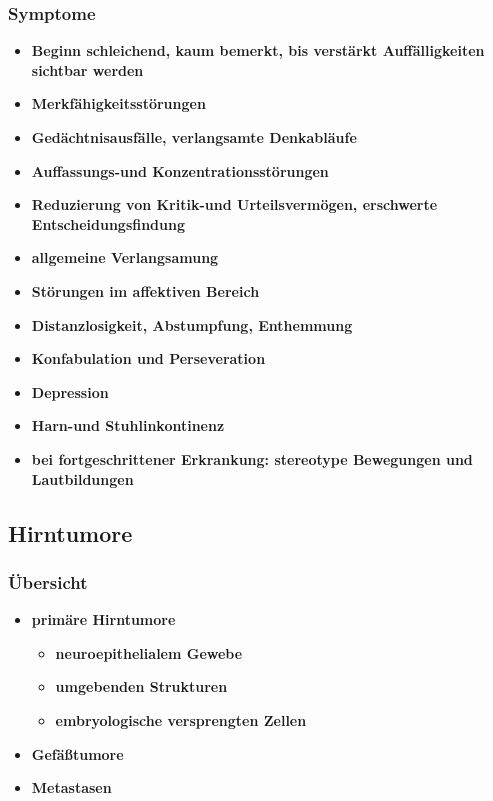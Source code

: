 		\subsubsection{Symptome}
			\begin{itemize}
				\item \textbf{Beginn schleichend, kaum bemerkt, bis verstärkt Auffälligkeiten sichtbar werden}
				\item \textbf{Merkfähigkeitsstörungen}
				\item \textbf{Gedächtnisausfälle, verlangsamte Denkabläufe}
				\item \textbf{Auffassungs-und Konzentrationsstörungen}
				\item \textbf{Reduzierung von Kritik-und Urteilsvermögen, erschwerte Entscheidungsfindung}
				\item \textbf{allgemeine Verlangsamung}
				\item \textbf{Störungen im affektiven Bereich}
				\item \textbf{Distanzlosigkeit, Abstumpfung, Enthemmung}
				\item \textbf{Konfabulation und Perseveration}
				\item \textbf{Depression}
				\item \textbf{Harn-und Stuhlinkontinenz}
				\item \textbf{bei fortgeschrittener Erkrankung: stereotype Bewegungen und  Lautbildungen}
			\end{itemize}
	\subsection{Hirntumore}
		\subsubsection{Übersicht}
			\begin{itemize}
				\item \textbf{primäre Hirntumore}
					\begin{itemize}
						\item \textbf{neuroepithelialem Gewebe}
						\item \textbf{umgebenden Strukturen}
						\item \textbf{embryologische versprengten Zellen}
					\end{itemize}
				\item \textbf{Gefäßtumore}
				\item \textbf{Metastasen}
			\end{itemize}
